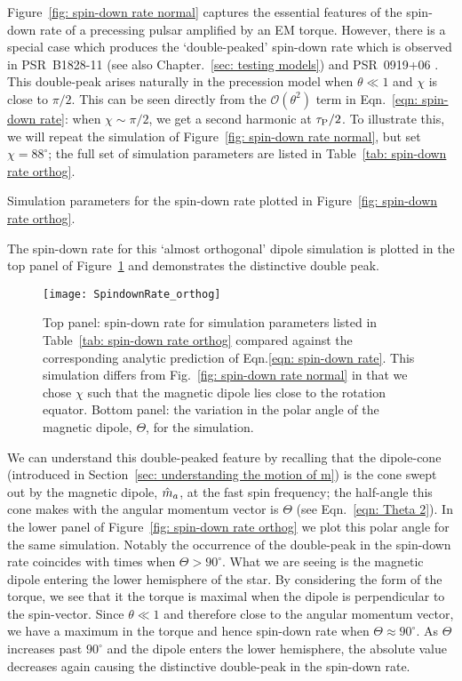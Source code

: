 \documentclass[../full_thesis/full_thesis.tex]{subfiles}
\newcommand{\thisdir}{../inertial_frame}
\begin{document}
Figure~\ref{fig: spin-down rate normal} captures the essential features of the
spin-down rate of a precessing pulsar amplified by an EM torque. However, there
is a special case which produces the `double-peaked' spin-down rate which is
observed in PSR~B1828-11 \citep{Lyne2010} (see also Chapter.~\ref{sec: testing
models}) and PSR~0919+06 \citep{Perera2015}.  This double-peak arises naturally
in the precession model when $\theta \ll 1$ and $\chi$ is close to $\pi/2$.
This can be seen directly from the $\mathcal{O}(\theta^{2})$ term in
Eqn.~\eqref{eqn: spin-down rate}: when $\chi \sim \pi/2$, we get a second
harmonic at $\tau_{\mathrm{P}}/2$. To illustrate this, we will repeat the simulation of
Figure~\ref{fig: spin-down rate normal}, but set $\chi=88^{\circ}$; the full
set of simulation parameters are listed in Table~\ref{tab: spin-down rate
orthog}.
\begin{table}[htb]
\centering

\caption{Simulation parameters for the spin-down rate plotted in Figure~\ref{fig:
spin-down rate orthog}.}
\label{tab: spin-down rate orthog}
\end{table}
The spin-down rate for this `almost orthogonal' dipole simulation is plotted
in the top panel of Figure~\ref{fig: spin-down rate orthog} and demonstrates the
distinctive double peak.
\begin{figure}[htb]
\centering
\texttt{[image: SpindownRate\_orthog]}
\caption{Top panel: spin-down rate for simulation parameters listed in Table~\ref{tab:
spin-down rate orthog} compared against the corresponding analytic prediction
of Eqn.\eqref{eqn: spin-down rate}. This simulation differs from
Fig.~\ref{fig: spin-down rate normal} in that we chose $\chi$ such that the
magnetic dipole lies close to the rotation equator. Bottom panel: the variation
in the polar angle of the magnetic dipole, $\Theta$, for the simulation.}
\label{fig: spin-down rate orthog}
\end{figure}

We can understand this double-peaked feature by recalling that the dipole-cone
(introduced in Section~\ref{sec: understanding the motion of m}) is the
cone swept out by the magnetic dipole, $\hat{m}_a$, at the fast spin frequency; the
half-angle this cone makes with the angular momentum vector is $\Theta$ (see
Eqn.~\eqref{eqn: Theta 2}).  In the lower panel of Figure~\ref{fig: spin-down
rate orthog} we plot this polar angle for the same simulation. Notably the
occurrence of the double-peak in the spin-down rate coincides with times when
$\Theta > 90^{\circ}$. What we are seeing is the magnetic dipole entering the
lower hemisphere of the star. By considering the form of the
\citet{Deutsch1955} torque, we see that it the torque is maximal when the
dipole is perpendicular to the spin-vector. Since $\theta \ll 1$ and therefore
close to the angular momentum vector, we have a maximum in the torque and hence
spin-down rate when $\Theta \approx 90^{\circ}$. As $\Theta$ increases past
$90^{\circ}$ and the dipole enters the lower hemisphere, the absolute value
decreases again causing the distinctive double-peak in the spin-down rate.
\end{document}
